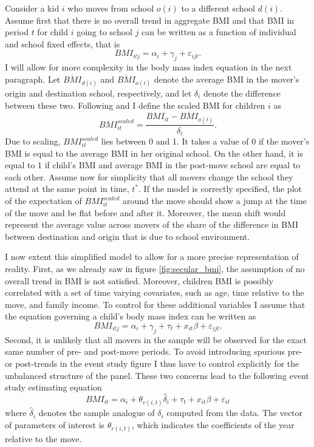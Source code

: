 \documentclass[twoside,12pt]{article}
\begin{document}
Consider a kid $i$ who moves from school $o(i)$ to a different school $d(i)$. Assume first that there is no overall trend in aggregate BMI and that BMI in period $t$ for child $i$ going to school $j$ can be written as a function of individual and school fixed effects, that is 
\begin{equation}
BMI_{itj} = \alpha_i + \gamma_j + \varepsilon_{ijt}.
\end{equation}
I will allow for more complexity in the body mass index equation in the next paragraph. Let $\overline{BMI}_{d(i)}$ and $\overline{BMI}_{o(i)}$ denote the average BMI in the mover's origin and destination school, respectively, and let $\delta_i$ denote the difference between these two. Following \cite{bronnenberg2012evolution} and \cite{finkelstein2016sources} I define the scaled BMI for children $i$ as
\begin{equation}
BMI_{it}^{scaled} = \frac{BMI_{it}-\overline{BMI}_{o(i)}}{\delta_i}.
\end{equation}
Due to scaling, $BMI_{it}^{scaled}$ lies between 0 and 1. It takes a value of 0 if the mover's BMI is equal to the average BMI in her original school. On the other hand, it is equal to 1 if child's BMI and average BMI in the post-move school are equal to each other. Assume now for simplicity that all movers change the school they attend at the same point in time, $t^*$. If the model is correctly specified, the plot of the expectation of $BMI_{it}^{scaled}$ around the move should show a jump at the time of the move and be flat before and after it. Moreover, the mean shift would represent the average value across movers of the share of the difference in BMI between destination and origin that is due to school environment.

I now extent this simplified model to allow for a more precise representation of reality. First, as we already saw in figure \ref{fig:secular_bmi}, the assumption of no overall trend in BMI is not satisfied. Moreover, children BMI is possibly correlated with a set of time varying covariates, such as age, time relative to the move, and family income. To control for these additional variables I assume that the equation governing a child's body mass index can be written as
\begin{equation}
BMI_{itj} = \alpha_i + \gamma_j + \tau_t + x_{it}\beta + \varepsilon_{ijt}.
\end{equation}
Second, it is unlikely that all movers in the sample will be observed for the exact same number of pre- and post-move periods. To avoid introducing spurious pre- or post-trends in the event study figure I thus have to control explicitly for the unbalanced structure of the panel. These two concerns lead to the following event study estimating equation
\begin{equation}\label{event_study}
BMI_{it} = \alpha_i + \theta_{r(i,t)}\hat{\delta}_i + \tau_t + x_{it}\beta + \varepsilon_{it}
\end{equation}
where $\hat{\delta}_i$ denotes the sample analogue of $\delta_i$ computed from the data. The vector of parameters of interest is $\theta_{r(i,t)}$, which indicates the coefficients of the year relative to the move. 
\end{document}
